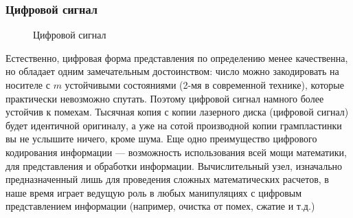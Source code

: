 \begin{frame}
\frametitle{Цифровой сигнал}
\begin{figure}
    \begin{center}
    \end{center}
    \caption{Цифровой сигнал}\label{pict:digital}
\end{figure} 
\end{frame}


Естественно, цифровая форма представления по определению менее качественна, но обладает одним замечательным достоинством: число можно закодировать на носителе с $m$ устойчивыми состояниями (2-мя в современной технике), которые практически невозможно спутать. Поэтому цифровой сигнал намного более устойчив к помехам. Тысячная копия с копии лазерного диска (цифровой сигнал) будет идентичной оригиналу, а уже на сотой производной копии грампластинки вы не услышите ничего, кроме шума. Еще одно преимущество цифрового кодирования информации --- возможность использования всей мощи математики, для представления и обработки информации. Вычислительный узел, изначально предназначенный лишь для проведения сложных математических расчетов, в наше время играет ведущую роль в любых манипуляциях с цифровым представлением информации (например, очистка от помех, сжатие и т.д.)


